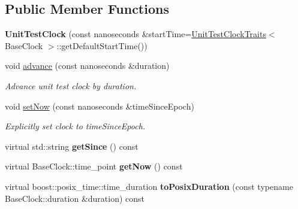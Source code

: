 \subsection*{Public Member Functions}
\begin{DoxyCompactItemize}
\item 
{\bfseries Unit\+Test\+Clock} (const nanoseconds \&start\+Time=\hyperlink{classndn_1_1time_1_1UnitTestClockTraits}{Unit\+Test\+Clock\+Traits}$<$ Base\+Clock $>$\+::get\+Default\+Start\+Time())\hypertarget{classndn_1_1time_1_1UnitTestClock_a546a67be3934f63ed036b9585b362af5}{}\label{classndn_1_1time_1_1UnitTestClock_a546a67be3934f63ed036b9585b362af5}

\item 
void \hyperlink{classndn_1_1time_1_1UnitTestClock_adc17792822d600b77b7a5b59e285a59f}{advance} (const nanoseconds \&duration)\hypertarget{classndn_1_1time_1_1UnitTestClock_adc17792822d600b77b7a5b59e285a59f}{}\label{classndn_1_1time_1_1UnitTestClock_adc17792822d600b77b7a5b59e285a59f}

\begin{DoxyCompactList}\small\item\em Advance unit test clock by {\ttfamily duration}. \end{DoxyCompactList}\item 
void \hyperlink{classndn_1_1time_1_1UnitTestClock_a9b84b834f21257f7cfd43fa30c8147ef}{set\+Now} (const nanoseconds \&time\+Since\+Epoch)\hypertarget{classndn_1_1time_1_1UnitTestClock_a9b84b834f21257f7cfd43fa30c8147ef}{}\label{classndn_1_1time_1_1UnitTestClock_a9b84b834f21257f7cfd43fa30c8147ef}

\begin{DoxyCompactList}\small\item\em Explicitly set clock to {\ttfamily time\+Since\+Epoch}. \end{DoxyCompactList}\item 
virtual std\+::string {\bfseries get\+Since} () const\hypertarget{classndn_1_1time_1_1UnitTestClock_ab135f14fc7c54eb371d0cb05f52a4961}{}\label{classndn_1_1time_1_1UnitTestClock_ab135f14fc7c54eb371d0cb05f52a4961}

\item 
virtual Base\+Clock\+::time\+\_\+point {\bfseries get\+Now} () const\hypertarget{classndn_1_1time_1_1UnitTestClock_a76c2bcd5b2d307759c0084d2e331b3af}{}\label{classndn_1_1time_1_1UnitTestClock_a76c2bcd5b2d307759c0084d2e331b3af}

\item 
virtual boost\+::posix\+\_\+time\+::time\+\_\+duration {\bfseries to\+Posix\+Duration} (const typename Base\+Clock\+::duration \&duration) const\hypertarget{classndn_1_1time_1_1UnitTestClock_af5ffc5de986d875e2ade2faea2c1d000}{}\label{classndn_1_1time_1_1UnitTestClock_af5ffc5de986d875e2ade2faea2c1d000}

\end{DoxyCompactItemize}


